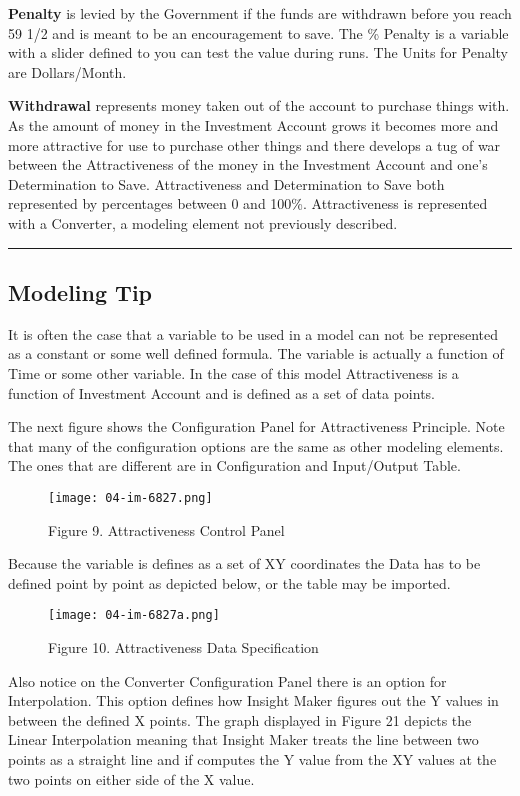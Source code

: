 \documentclass[]{memoir}
\let\Oldincludegraphics\includegraphics
\renewcommand{\includegraphics}[1]{\Oldincludegraphics[max size={\textwidth}{\textheight}]{#1}}
\begin{document}
\textbf{Penalty} is levied by the Government if the funds are withdrawn
before you reach 59 1/2 and is meant to be an encouragement to save. The
\% Penalty is a variable with a slider defined to you can test the value
during runs. The Units for Penalty are Dollars/Month.

\textbf{Withdrawal} represents money taken out of the account to
purchase things with. As the amount of money in the Investment Account
grows it becomes more and more attractive for use to purchase other
things and there develops a tug of war between the Attractiveness of the
money in the Investment Account and one's Determination to Save.
Attractiveness and Determination to Save both represented by percentages
between 0 and 100\%. Attractiveness is represented with a Converter, a
modeling element not previously described.

\begin{center}\rule{3in}{0.4pt}\end{center}

\subsection{Modeling Tip}

It is often the case that a variable to be used in a model can not be
represented as a constant or some well defined formula. The variable is
actually a function of Time or some other variable. In the case of this
model Attractiveness is a function of Investment Account and is defined
as a set of data points.

The next figure shows the Configuration Panel for Attractiveness
Principle. Note that many of the configuration options are the same as
other modeling elements. The ones that are different are in
Configuration and Input/Output Table.

\begin{figure}[htbp]
\centering
\texttt{[image: 04-im-6827.png]}
\caption{Figure 9. Attractiveness Control Panel}
\end{figure}

Because the variable is defines as a set of XY coordinates the Data has
to be defined point by point as depicted below, or the table may be
imported.

\begin{figure}[htbp]
\centering
\texttt{[image: 04-im-6827a.png]}
\caption{Figure 10. Attractiveness Data Specification}
\end{figure}

Also notice on the Converter Configuration Panel there is an option for
Interpolation. This option defines how Insight Maker figures out the Y
values in between the defined X points. The graph displayed in Figure 21
depicts the Linear Interpolation meaning that Insight Maker treats the
line between two points as a straight line and if computes the Y value
from the XY values at the two points on either side of the X value.
\end{document}
